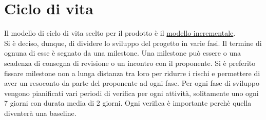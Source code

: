 	\section{Ciclo di vita}
		Il modello di ciclo di vita scelto per il prodotto è il \underline{modello incrementale}.\\Si è deciso, dunque, di dividere lo sviluppo del progetto in varie fasi. Il termine di ognuna di esse è segnato da una milestone. Una milestone può essere o una scadenza di consegna di revisione o un incontro con il proponente. Si è preferito fissare milestone non a lunga distanza tra loro per ridurre i rischi e permettere di aver un resoconto da parte del proponente ad ogni fase. Per ogni fase di sviluppo vengono pianificati vari periodi di verifica per ogni attività, solitamente uno ogni 7 giorni con durata media di 2 giorni. Ogni verifica è importante perchè quella diventerà una baseline.
